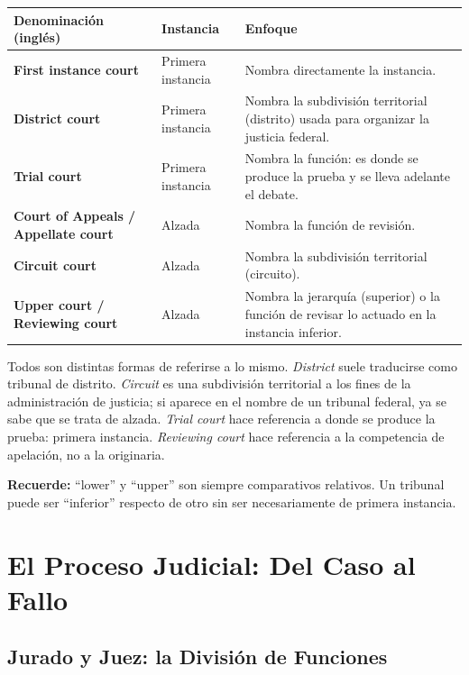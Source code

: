 \documentclass[12pt,oneside]{book}
\begin{document}
\begin{table}[H]
\centering
\begin{tabularx}{\textwidth}{p{3.5cm} p{2.5cm} X}
\toprule
\textbf{Denominación (inglés)} & \textbf{Instancia} & \textbf{Enfoque} \\
\midrule
\textbf{First instance court} & Primera instancia & Nombra directamente la instancia. \\
\midrule
\textbf{District court} & Primera instancia & Nombra la subdivisión territorial (distrito) usada para organizar la justicia federal. \\
\midrule
\textbf{Trial court} & Primera instancia & Nombra la función: es donde se produce la prueba y se lleva adelante el debate. \\
\midrule
\textbf{Court of Appeals / Appellate court} & Alzada & Nombra la función de revisión. \\
\midrule
\textbf{Circuit court} & Alzada & Nombra la subdivisión territorial (circuito). \\
\midrule
\textbf{Upper court / Reviewing court} & Alzada & Nombra la jerarquía (superior) o la función de revisar lo actuado en la instancia inferior. \\
\bottomrule
\end{tabularx}
\end{table}

Todos son distintas formas de referirse a lo mismo. \textit{District} suele traducirse como tribunal de distrito. \textit{Circuit} es una subdivisión territorial a los fines de la administración de justicia; si aparece en el nombre de un tribunal federal, ya se sabe que se trata de alzada. \textit{Trial court} hace referencia a donde se produce la prueba: primera instancia. \textit{Reviewing court} hace referencia a la competencia de apelación, no a la originaria.

\textbf{Recuerde:} ``lower'' y ``upper'' son siempre comparativos relativos. Un tribunal puede ser ``inferior'' respecto de otro sin ser necesariamente de primera instancia.

\newpage

\chapter{El Proceso Judicial: Del Caso al Fallo}

\section{Jurado y Juez: la División de Funciones}
\end{document}
